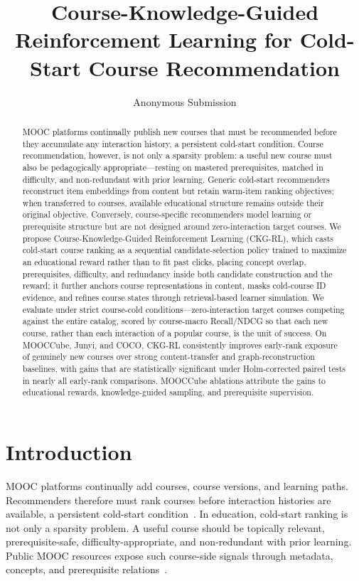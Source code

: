 \documentclass[letterpaper]{article}
\begin{document}
\title{Course-Knowledge-Guided Reinforcement Learning for Cold-Start Course Recommendation}
\author{Anonymous Submission}
\affiliations{}

\maketitle

\begin{abstract}
MOOC platforms continually publish new courses that must be recommended before they accumulate any interaction history, a persistent cold-start condition. Course recommendation, however, is not only a sparsity problem: a useful new course must also be pedagogically appropriate---resting on mastered prerequisites, matched in difficulty, and non-redundant with prior learning. Generic cold-start recommenders reconstruct item embeddings from content but retain warm-item ranking objectives; when transferred to courses, available educational structure remains outside their original objective. Conversely, course-specific recommenders model learning or prerequisite structure but are not designed around zero-interaction target courses. We propose Course-Knowledge-Guided Reinforcement Learning (CKG-RL), which casts cold-start course ranking as a sequential candidate-selection policy trained to maximize an educational reward rather than to fit past clicks, placing concept overlap, prerequisites, difficulty, and redundancy inside both candidate construction and the reward; it further anchors course representations in content, masks cold-course ID evidence, and refines course states through retrieval-based learner simulation. We evaluate under strict course-cold conditions---zero-interaction target courses competing against the entire catalog, scored by course-macro Recall/NDCG so that each new course, rather than each interaction of a popular course, is the unit of success. On MOOCCube, Junyi, and COCO, CKG-RL consistently improves early-rank exposure of genuinely new courses over strong content-transfer and graph-reconstruction baselines, with gains that are statistically significant under Holm-corrected paired tests in nearly all early-rank comparisons. MOOCCube ablations attribute the gains to educational rewards, knowledge-guided sampling, and prerequisite supervision.
\end{abstract}

\section{Introduction}
MOOC platforms continually add courses, course versions, and learning paths. Recommenders therefore must rank courses before interaction histories are available, a persistent cold-start condition~\cite{schein2002coldstart,gantner2010attribute,lin2024tdro,zhang2025coldstartllm}. In education, cold-start ranking is not only a sparsity problem. A useful course should be topically relevant, prerequisite-safe, difficulty-appropriate, and non-redundant with prior learning. Public MOOC resources expose such course-side signals through metadata, concepts, and prerequisite relations~\cite{yu2020mooccube,wang2021mooccubex}.
\end{document}
